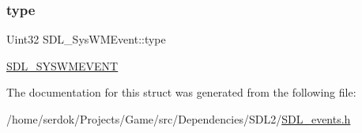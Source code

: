 \subsubsection{\texorpdfstring{type}{type}}
{\footnotesize\ttfamily Uint32 S\+D\+L\+\_\+\+Sys\+W\+M\+Event\+::type}

\hyperlink{SDL__events_8h_a3b589e89be6b35c02e0dd34a55f3fccaa73749d735a18ce6ef17a09ee70d5dbe7}{S\+D\+L\+\_\+\+S\+Y\+S\+W\+M\+E\+V\+E\+NT} 

The documentation for this struct was generated from the following file\+:\begin{DoxyCompactItemize}
\item 
/home/serdok/\+Projects/\+Game/src/\+Dependencies/\+S\+D\+L2/\hyperlink{SDL__events_8h}{S\+D\+L\+\_\+events.\+h}\end{DoxyCompactItemize}
